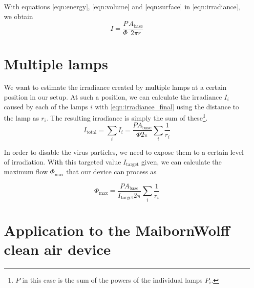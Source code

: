 \documentclass[12pt]{article}
\begin{document}
With equations \eqref{eqn:energy}, \eqref{eqn:volume} and \eqref{eqn:surface} in \eqref{eqn:irradiance}, we obtain
\begin{equation}
I =\frac{P }{\Phi } \frac{A_{\text{base}}}{2 \pi r }\label{eqn:irradiance_final}
\end{equation}


\section{Multiple lamps}\label{sect:multitube}
We want to estimate the irradiance created by multiple lamps at a certain position in our setup. At such a position, we can calculate the irradiance $I_i $ caused by each of the lamps $i$ with \eqref{eqn:irradiance_final} using the distance to the lamp as $r_{i}$. The resulting irradiance is simply the sum of these\footnote{$P$ in this case is the sum of the powers of the individual lamps $P_i$.}.
\begin{equation}
I_{\text{total}}=  \sum_{i} I_i = \frac{P A_{\text{base}}}{\Phi 2 \pi}  \sum_{i} \frac{1}{ r_i }
\end{equation}

In order to disable the virus particles, we need to expose them to a certain level of irradiation. With this targeted value $I_{\text{target}}$ given, we can calculate the maximum flow $\Phi_{\text{max}}$ that our device can process as

\begin{equation}
\Phi_{\text{max}}=  \frac{P A_{\text{base}}}{I_{\text{target}} 2 \pi}  \sum_{i} \frac{1}{ r_i }
\end{equation}

\section{Application to the MaibornWolff clean air device}
\end{document}
